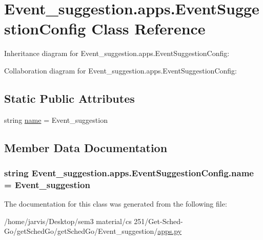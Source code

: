 \hypertarget{classEvent__suggestion_1_1apps_1_1EventSuggestionConfig}{}\section{Event\+\_\+suggestion.\+apps.\+Event\+Suggestion\+Config Class Reference}
\label{classEvent__suggestion_1_1apps_1_1EventSuggestionConfig}


Inheritance diagram for Event\+\_\+suggestion.\+apps.\+Event\+Suggestion\+Config\+:


Collaboration diagram for Event\+\_\+suggestion.\+apps.\+Event\+Suggestion\+Config\+:
\subsection*{Static Public Attributes}
\begin{DoxyCompactItemize}
\item 
string \hyperlink{classEvent__suggestion_1_1apps_1_1EventSuggestionConfig_a4b00864b14aeb52b304bd86deb5466e3}{name} = \textquotesingle{}Event\+\_\+suggestion\textquotesingle{}
\end{DoxyCompactItemize}


\subsection{Member Data Documentation}
\subsubsection[{\texorpdfstring{name}{name}}]{\setlength{\rightskip}{0pt plus 5cm}string Event\+\_\+suggestion.\+apps.\+Event\+Suggestion\+Config.\+name = \textquotesingle{}Event\+\_\+suggestion\textquotesingle{}\hspace{0.3cm}{\ttfamily [static]}}\hypertarget{classEvent__suggestion_1_1apps_1_1EventSuggestionConfig_a4b00864b14aeb52b304bd86deb5466e3}{}\label{classEvent__suggestion_1_1apps_1_1EventSuggestionConfig_a4b00864b14aeb52b304bd86deb5466e3}


The documentation for this class was generated from the following file\+:\begin{DoxyCompactItemize}
\item 
/home/jarvis/\+Desktop/sem3 material/cs 251/\+Get-\/\+Sched-\/\+Go/get\+Sched\+Go/get\+Sched\+Go/\+Event\+\_\+suggestion/\hyperlink{Event__suggestion_2apps_8py}{apps.\+py}\end{DoxyCompactItemize}

